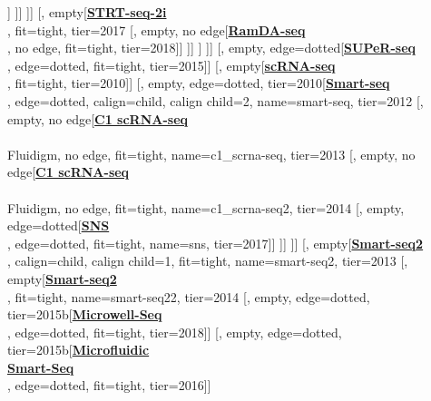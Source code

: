 \documentclass[12pt, a4]{article}
\begin{document}
\begin{center}
\begin{forest}
						[, empty[\href{https://www.nature.com/articles/s41467-018-05347-6}{\textbf{mcSCRB-seq}}\\\citealt{bagnoli2018}, fit=tight, tier=2018]]
					]]
				]]
				[, empty[\href{https://www.nature.com/articles/s41598-017-16546-4}{\textbf{STRT-seq-2i}}\\\citealt{hochgerner2017}, fit=tight, tier=2017
					[, empty, no edge[\href{https://doi.org/10.1038/s41467-018-02866-0}{\textbf{RamDA-seq}}\\\citealt{hayashi2018}, no edge, fit=tight, tier=2018]]
				]]
			]
		]]
		[, empty, edge=dotted[\href{https://genomebiology.biomedcentral.com/articles/10.1186/s13059-015-0706-1}{\textbf{SUPeR-seq}}\\\citealt{fan2015}, edge=dotted, fit=tight, tier=2015]]
		[, empty[\href{https://www.nature.com/articles/nprot.2009.236}{\textbf{scRNA-seq}}\\\citealt{tang2010}, fit=tight, tier=2010]]
		[, empty, edge=dotted, tier=2010[\href{https://www.nature.com/articles/nbt.2282}{\textbf{Smart-seq}}\\\citealt{ramskold2012}, edge=dotted, calign=child, calign child=2, name=smart-seq, tier=2012
			[, empty, no edge[\href{https://www.nature.com/articles/nmeth.2694}{\textbf{C1 scRNA-seq}}\\\citealt{wu2013}\\Fluidigm, no edge, fit=tight, name=c1_scrna-seq, tier=2013
				[, empty, no edge[\href{https://www.nature.com/articles/nbt.2967}{\textbf{C1 scRNA-seq}}\\\citealt{pollen2014}\\Fluidigm, no edge, fit=tight, name=c1_scrna-seq2, tier=2014
					[, empty, edge=dotted[\href{https://www.nature.com/articles/s41598-017-04426-w}{\textbf{SNS}}\\\citealt{lake2017b}, edge=dotted, fit=tight, name=sns, tier=2017]]
					]]
			]]
			[, empty[\href{https://www.nature.com/articles/nmeth.2639}{\textbf{Smart-seq2}}\\\citealt{picelli2013}, calign=child, calign child=1, fit=tight, name=smart-seq2, tier=2013
				[, empty[\href{https://www.nature.com/articles/nprot.2014.006}{\textbf{Smart-seq2}}\\\citealt{picelli2014}, fit=tight, name=smart-seq22, tier=2014
						[, empty, edge=dotted, tier=2015b[\href{https://www.cell.com/cell/fulltext/S0092-8674(18)30116-8}{\textbf{Microwell-Seq}}\\\citealt{han2018}, edge=dotted, fit=tight, tier=2018]]
						[, empty, edge=dotted, tier=2015b[\href{https://www.nature.com/articles/ncomms10220}{\textbf{Microfluidic}}\\\href{https://www.nature.com/articles/ncomms10220}{\textbf{Smart-Seq}}\\\citealt{kimmerling2016}, edge=dotted, fit=tight, tier=2016]]

\end{forest}
\end{center}
\end{document}
